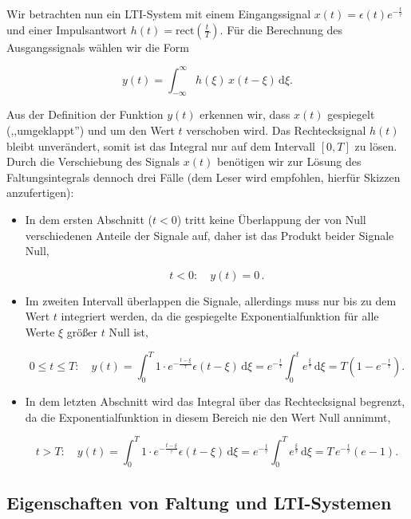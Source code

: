 \begin{beispiel}
Wir betrachten nun ein LTI-System mit einem Eingangssignal $x(t) = \epsilon(t)e^{-\frac{t}{\tau}}$ und einer Impulsantwort $h(t) = \mathrm{rect}\!\left(\tfrac{t}{T}\right)$. Für die Berechnung des Ausgangssignals wählen wir die Form

$$
y(t) = \int_{-\infty}^{\infty} h(\xi)\,x(t - \xi)\,\mathrm{d}\xi.
$$

Aus der Definition der Funktion $y(t)$ erkennen wir, dass $x(t)$ gespiegelt (,,umgeklappt'') und um den Wert $t$ verschoben wird. Das Rechtecksignal $h(t)$ bleibt unverändert, somit ist das Integral nur auf dem Intervall $[0, T]$ zu lösen. Durch die Verschiebung des Signals $x(t)$ benötigen wir zur Lösung des Faltungsintegrals dennoch drei Fälle (dem Leser wird empfohlen, hierfür Skizzen anzufertigen):

\begin{itemize}
  \item In dem ersten Abschnitt ($t < 0$) tritt keine Überlappung der von Null verschiedenen Anteile der Signale auf, daher ist das Produkt beider Signale Null,

$$
t < 0:\quad y(t) = 0\,.
$$

  \item Im zweiten Intervall überlappen die Signale, allerdings muss nur bis zu dem Wert $t$ integriert werden, da die gespiegelte Exponentialfunktion für alle Werte $\xi$ größer $t$ Null ist,

$$
0 \leq t \leq T:\quad y(t) = \int_0^T 1 \cdot e^{-\frac{t-\xi}{\tau}}\epsilon(t-\xi)\,\mathrm{d}\xi = e^{-\frac{t}{\tau}}\int_0^t e^{\frac{\xi}{\tau}}\,\mathrm{d}\xi = T\!\left(1 - e^{-\frac{t}{\tau}}\right).
$$

  \item In dem letzten Abschnitt wird das Integral über das Rechtecksignal begrenzt, da die Exponentialfunktion in diesem Bereich nie den Wert Null annimmt,

$$
t > T:\quad y(t) = \int_0^T 1 \cdot e^{-\frac{t-\xi}{\tau}}\epsilon(t-\xi)\,\mathrm{d}\xi = e^{-\frac{t}{\tau}}\int_0^T e^{\frac{\xi}{\tau}}\,\mathrm{d}\xi = T\,e^{-\frac{t}{\tau}}\!\left(e - 1\right).
$$
\end{itemize}
\end{beispiel}

\subsection{Eigenschaften von Faltung und LTI-Systemen}
\label{sec:faltung-eigenschaften}

